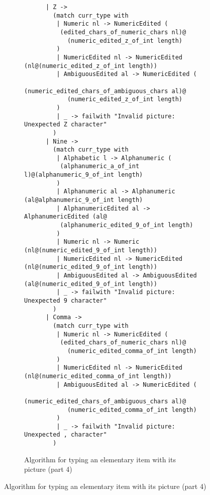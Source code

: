 \documentclass[a4paper,10pt]{article}
\begin{document}
\begin{figure}[!ht]
  \ContinuedFloat
  \begin{subfigure}{1.05\textwidth}
    \begin{verbatim}
      | Z ->
        (match curr_type with
         | Numeric nl -> NumericEdited (
          (edited_chars_of_numeric_chars nl)@
            (numeric_edited_z_of_int length)
         )
         | NumericEdited nl -> NumericEdited (nl@(numeric_edited_z_of_int length))
         | AmbiguousEdited al -> NumericEdited (
          (numeric_edited_chars_of_ambiguous_chars al)@
            (numeric_edited_z_of_int length)
         )
         | _ -> failwith "Invalid picture: Unexpected Z character"
        )
      | Nine ->
        (match curr_type with
         | Alphabetic l -> Alphanumeric (
          (alphanumeric_a_of_int l)@(alphanumeric_9_of_int length)
         )
         | Alphanumeric al -> Alphanumeric (al@alphanumeric_9_of_int length)
         | AlphanumericEdited al -> AlphanumericEdited (al@
          (alphanumeric_edited_9_of_int length)
         )
         | Numeric nl -> Numeric (nl@(numeric_edited_9_of_int length))
         | NumericEdited nl -> NumericEdited (nl@(numeric_edited_9_of_int length))
         | AmbiguousEdited al -> AmbiguousEdited (al@(numeric_edited_9_of_int length))
         | _ -> failwith "Invalid picture: Unexpected 9 character"
        )
      | Comma ->
        (match curr_type with
         | Numeric nl -> NumericEdited (
          (edited_chars_of_numeric_chars nl)@
            (numeric_edited_comma_of_int length)
         )
         | NumericEdited nl -> NumericEdited (nl@(numeric_edited_comma_of_int length))
         | AmbiguousEdited al -> NumericEdited (
          (numeric_edited_chars_of_ambiguous_chars al)@
            (numeric_edited_comma_of_int length)
         )
         | _ -> failwith "Invalid picture: Unexpected , character"
        )
    \end{verbatim}
    \caption{Algorithm for typing an elementary item with its picture (part 4)}
    \label{fig:algo_typ_elem_pic_4}
  \end{subfigure}
\end{figure}
\end{document}
